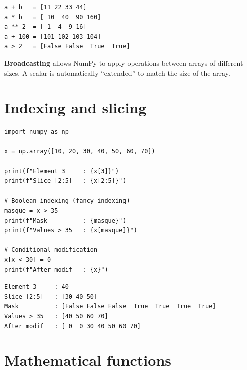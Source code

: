 \begin{codeoutput}
\begin{verbatim}
a + b   = [11 22 33 44]
a * b   = [ 10  40  90 160]
a ** 2  = [ 1  4  9 16]
a + 100 = [101 102 103 104]
a > 2   = [False False  True  True]
\end{verbatim}
\end{codeoutput}

\begin{definition}[Broadcasting]
\textbf{Broadcasting} allows NumPy to apply operations
between arrays of different sizes. A scalar is automatically
``extended'' to match the size of the array.
\end{definition}

\section{Indexing and slicing}

\begin{codeblock}[title=\textbf{Python}]
\begin{verbatim}
import numpy as np

x = np.array([10, 20, 30, 40, 50, 60, 70])

print(f"Element 3     : {x[3]}")
print(f"Slice [2:5]   : {x[2:5]}")

# Boolean indexing (fancy indexing)
masque = x > 35
print(f"Mask          : {masque}")
print(f"Values > 35   : {x[masque]}")

# Conditional modification
x[x < 30] = 0
print(f"After modif   : {x}")
\end{verbatim}
\end{codeblock}

\begin{codeoutput}
\begin{verbatim}
Element 3     : 40
Slice [2:5]   : [30 40 50]
Mask          : [False False False  True  True  True  True]
Values > 35   : [40 50 60 70]
After modif   : [ 0  0 30 40 50 60 70]
\end{verbatim}
\end{codeoutput}

\section{Mathematical functions}

